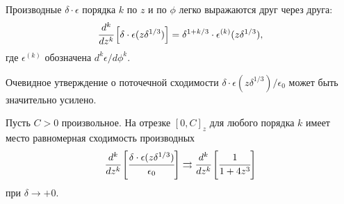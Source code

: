 Производные $\delta \cdot \epsilon$ порядка $k$ по $z$ и по $\phi$ легко выражаются друг через друга:
\[
	\cfrac{d^k}{d z^k} \left[ \delta \cdot \epsilon(z \delta^{1/3}) \right] = \delta^{1 + k/3} \cdot \epsilon^{(k)}(z \delta^{1/3}),
\]
где $\epsilon^{(k)}$ обозначена $d^k \epsilon / d \phi^k$.

Очевидное утверждение о поточечной сходимости $\delta \cdot \epsilon(z \delta^{1/3}) / \epsilon_0$ может быть значительно усилено.

\begin{proposition}
	\label{prop:convergence_uniform}
	Пусть $C > 0$ произвольное. На отрезке $[0, C]_z$ для любого порядка $k$ имеет место равномерная сходимость производных
	\[
		\cfrac{d^k}{d z^k} \left[ \cfrac{\delta \cdot \epsilon(z \delta^{1/3})}{\epsilon_0} \right] \rightrightarrows \cfrac{d^k}{d z^k} \left[ \cfrac{1}{1 + 4 z^3} \right]
	\]
	при $\delta \to +0$.
\end{proposition}
